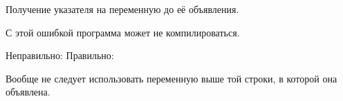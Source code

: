 \begin{typerror}
	Получение указателя на переменную до её объявления.

	С этой ошибкой программа может не компилироваться.

	Неправильно:
	Правильно:

	Вообще не следует использовать переменную выше той строки, в которой она объявлена.
\end{typerror}
